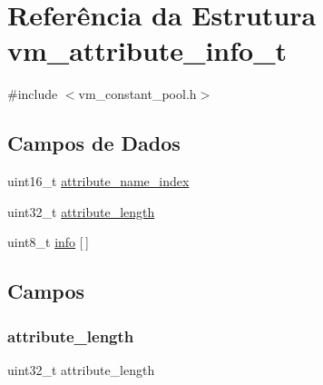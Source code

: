 \hypertarget{structvm__attribute__info__t}{}\section{Referência da Estrutura vm\+\_\+attribute\+\_\+info\+\_\+t}
\label{structvm__attribute__info__t}


{\ttfamily \#include $<$vm\+\_\+constant\+\_\+pool.\+h$>$}

\subsection*{Campos de Dados}
\begin{DoxyCompactItemize}
\item 
uint16\+\_\+t \hyperlink{structvm__attribute__info__t_ab03a9f3c15c8ca82d5a4290086c95036}{attribute\+\_\+name\+\_\+index}
\item 
uint32\+\_\+t \hyperlink{structvm__attribute__info__t_abb070541c65503dcb4d1828c3752f2ca}{attribute\+\_\+length}
\item 
uint8\+\_\+t \hyperlink{structvm__attribute__info__t_ae7298a15945258c127fdc64b7556459c}{info} \mbox{[}$\,$\mbox{]}
\end{DoxyCompactItemize}


\subsection{Campos}
\mbox{\label{structvm__attribute__info__t_abb070541c65503dcb4d1828c3752f2ca}} 
\subsubsection{\texorpdfstring{attribute\+\_\+length}{attribute\_length}}
{\footnotesize\ttfamily uint32\+\_\+t attribute\+\_\+length}

\mbox{\label{structvm__attribute__info__t_ab03a9f3c15c8ca82d5a4290086c95036}} 
